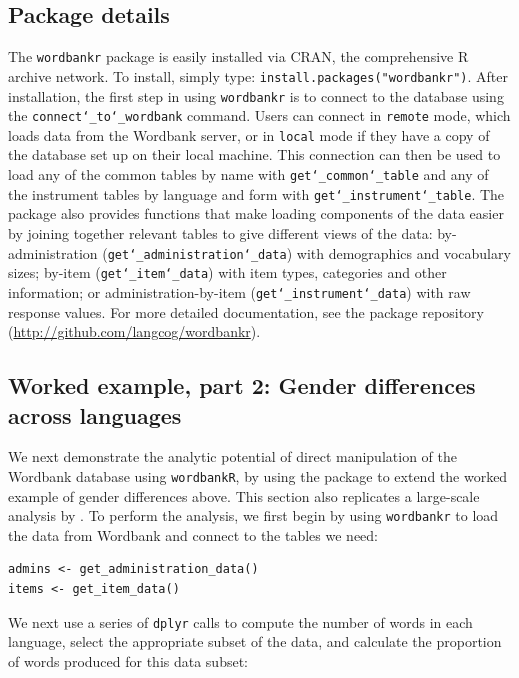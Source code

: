 \documentclass[man,noapacite]{apa}
\begin{document}
\subsection{Package details}

The \texttt{wordbankr} package is easily installed via CRAN, the comprehensive R archive network. To install, simply type: \texttt{install.packages("wordbankr")}. After installation, the first step in using \texttt{wordbankr} is to connect to the database using the \texttt{connect\char`_to\char`_wordbank} command. Users can connect in \texttt{remote} mode, which loads data from the Wordbank server, or in \texttt{local} mode if they have a copy of the database set up on their local machine. This connection can then be used to load any of the common tables by name with \texttt{get\char`_common\char`_table} and any of the instrument tables by language and form with \texttt{get\char`_instrument\char`_table}. The package also provides functions that make loading components of the data easier by joining together relevant tables to give different views of the data: by-administration (\texttt{get\char`_administration\char`_data}) with demographics and vocabulary sizes; by-item (\texttt{get\char`_item\char`_data}) with item types, categories and other information; or administration-by-item (\texttt{get\char`_instrument\char`_data}) with raw response values. For more detailed documentation, see the package repository (\url{http://github.com/langcog/wordbankr}).

\subsection{Worked example, part 2: Gender differences across languages}

We next demonstrate the analytic potential of direct manipulation of the Wordbank database using \texttt{wordbankR}, by using the package to extend the worked example of gender differences above. This section also replicates a large-scale analysis by . To perform the analysis, we first begin by using \texttt{wordbankr} to load the data from Wordbank and connect to the tables we need:

\begin{lstlisting}
admins <- get_administration_data()
items <- get_item_data()
\end{lstlisting}

\noindent We next use a series of \texttt{dplyr} calls to compute the number of words in each language,  select the appropriate subset of the data, and calculate the proportion of words produced for this data subset:
\end{document}
